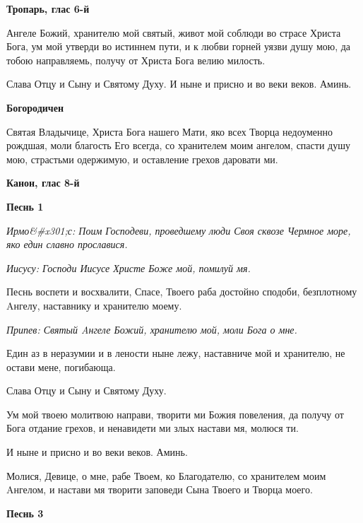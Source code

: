 \mychapterending

 



\bfseries Тропарь, глас 6-й\normalfont{}


Ангеле Божий, хранителю мой святый, живот мой соблюди во страсе Христа Бога, ум мой утверди во истиннем пути, и к любви горней уязви душу мою, да тобою направляемь, получу от Христа Бога велию милость.


Слава Отцу и Сыну и Святому Духу. И ныне и присно и во веки веков. Аминь.




\bfseries Богородичен\normalfont{}


Святая Владычице, Христа Бога нашего Мати, яко всех Творца недоуменно рождшая, моли благость Его всегда, со хранителем моим ангелом, спасти душу мою, страстьми одержимую, и оставление грехов даровати ми.




\bfseries Канон, глас 8-й\normalfont{}




\bfseries Песнь 1\normalfont{}


\itshape Ирмо&#x301;с:\normalfont{} Поим Господеви, проведшему люди Своя сквозе Чермное море, яко един славно прославися.


\itshape Иисусу:\normalfont{} Господи Иисусе Христе Боже мой, помилуй мя.


Песнь воспети и восхвалити, Спасе, Твоего раба достойно сподоби, безплотному Aнгелу, наставнику и хранителю моему.


\itshape Припев:\normalfont{} Святый Aнгеле Божий, хранителю мой, моли Бога о мне.


Един аз в неразумии и в лености ныне лежу, наставниче мой и хранителю, не остави мене, погибающа.


Слава Отцу и Сыну и Святому Духу.


Ум мой твоею молитвою направи, творити ми Божия повеления, да получу от Бога отдание грехов, и ненавидети ми злых настави мя, молюся ти.


И ныне и присно и во веки веков. Аминь.


Молися, Девице, о мне, рабе Твоем, ко Благодателю, со хранителем моим Aнгелом, и настави мя творити заповеди Сына Твоего и Творца моего.




\bfseries Песнь 3\normalfont{}


